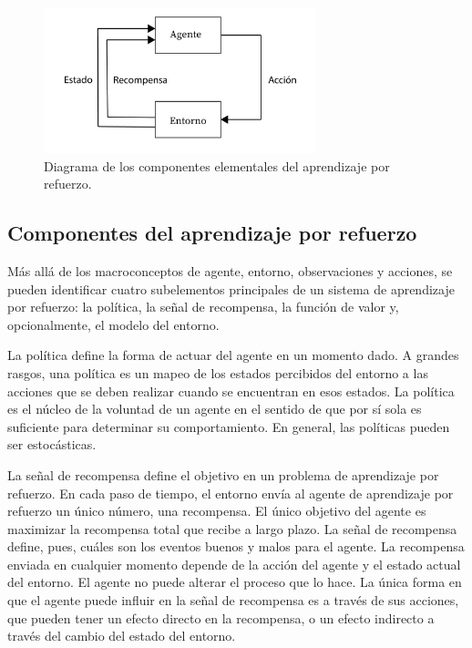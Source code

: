 \begin{figure}[ht!]
    \centering
    \includegraphics[width=0.7\textwidth]{Graphics/rl-elements.png}
    \caption{Diagrama de los componentes elementales del aprendizaje por refuerzo.}
    \label{fig:rl-elements}
\end{figure}

\subsection*{Componentes del aprendizaje por refuerzo}

Más allá de los macroconceptos de agente, entorno, observaciones y acciones, se pueden identificar cuatro subelementos principales de un sistema de aprendizaje por refuerzo: la política, la señal de recompensa, la función de valor y, opcionalmente, el modelo del entorno.

La política define la forma de actuar del agente en un momento dado. A grandes rasgos, una política es un mapeo de los estados percibidos del entorno a las acciones que se deben realizar cuando se encuentran en esos estados. La política es el núcleo de la voluntad de un agente en el sentido de que por sí sola es suficiente para determinar su comportamiento. En general, las políticas pueden ser estocásticas.

La señal de recompensa define el objetivo en un problema de aprendizaje por refuerzo. En cada paso de tiempo, el entorno envía al agente de aprendizaje por refuerzo un único número, una recompensa. El único objetivo del agente es maximizar la recompensa total que recibe a largo plazo. La señal de recompensa define, pues, cuáles son los eventos buenos y malos para el agente. La recompensa enviada en cualquier momento depende de la acción del agente y el estado actual del entorno. El agente no puede alterar el proceso que lo hace. La única forma en que el agente puede influir en la señal de recompensa es a través de sus acciones, que pueden tener un efecto directo en la recompensa, o un efecto indirecto a través del cambio del estado del entorno.

